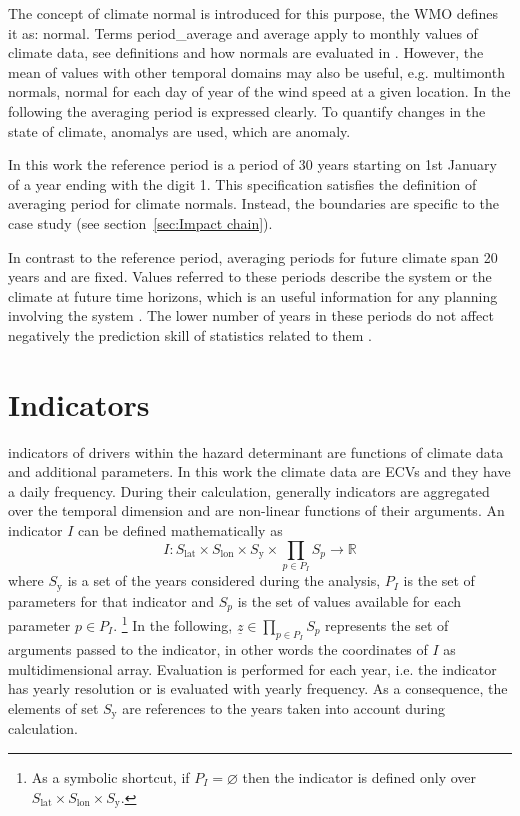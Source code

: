 The concept of climate \gls{normal} is introduced for this purpose, the \gls{WMO} defines it as: \glsdesc{normal}. Terms \gls{period_average} and \gls{average} apply to monthly values of climate data, see definitions and how normals are evaluated in \cite[5-6]{2017WorldMeteorologicalOrganizationWMOWMOGuidelines}. However, the mean of values with other temporal domains may also be useful, e.g. multimonth normals, normal for each day of year of the wind speed at a given location. In the following the averaging period is expressed clearly.
To quantify changes in the state of climate, \glspl{anomaly} are used, which are \glsdesc{anomaly}.

In this work the reference period is a period of 30 years starting on 1st January of a year ending with the digit 1. This specification satisfies the definition of averaging period for climate \glspl{normal}.
Instead, the boundaries are specific to the case study (see section~\ref{sec:Impact chain}).

In contrast to the reference period, averaging periods for future climate span 20 years and are fixed. Values referred to these periods describe the system or the climate at future time horizons, which is an useful information for any planning involving the system \cite[23]{2023CarlinThe2023}. The lower number of years in these periods do not affect negatively the prediction skill of statistics related to them \cite[17]{2017WorldMeteorologicalOrganizationWMOWMOGuidelines}.



\section{Indicators}
\label{sec:Indicators}
\Glspl{indicator} of \glspl{driver} within the \gls{hazard} \gls{determinant} are functions of climate data and additional parameters. In this work the climate data are \glspl{ECV} and they have a daily frequency.
During their calculation, generally \glspl{indicator} are aggregated over the temporal dimension and are non-linear functions of their arguments.
An \gls{indicator} $I$ can be defined mathematically as
\begin{equation}
  \label{eq:math_indicator}
  I : S_\text{lat} \times S_\text{lon} \times S_\text{y} \times \prod_{p \in P_I} S_p \to \mathbb{R}
\end{equation}
where $S_\text{y}$ is a set of the years considered during the analysis, $P_I$ is the set of parameters for that indicator and $S_p$ is the set of values available for each parameter $p \in P_I$.%
\footnote{As a symbolic shortcut, if $P_I = \varnothing$ then the indicator is defined only over $S_\text{lat} \times S_\text{lon} \times S_\text{y}$.}
In the following, $\underline{z} \in \prod_{p \in P_I} S_p$ represents the set of arguments passed to the \gls{indicator}, in other words the coordinates of $I$ as multidimensional array.
Evaluation is performed for each year, i.e. the \gls{indicator} has yearly resolution or is evaluated with yearly frequency. As a consequence, the elements of set $S_\text{y}$ are references to the years taken into account during calculation.

